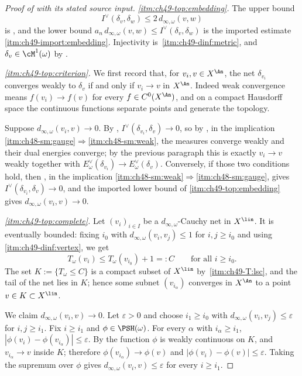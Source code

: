 \begin{proof}[Proof of  with its stated source input]
\emph{\cref{itm:ch49-top:embedding}.}  The upper bound
\[
 I^\vee(\delta_v,\delta_w)\le2\,d_{\infty,\omega}(v,w)
\]
is , and the lower bound
$a_n\,d_{\infty,\omega}(v,w)\le I^\vee(\delta_v,\delta_w)$
is the imported estimate
\,\cref{itm:ch49-import:embedding}.
Injectivity is
\,\cref{itm:ch49-dinf:metric}, and
$\delta_v\in\cM^1(\omega)$ by .

\emph{\cref{itm:ch49-top:criterion}.}  We first record that, for
$v_i,v\in X^{\An}$, the net $\delta_{v_i}$ converges weakly to
$\delta_v$ if and only if $v_i\to v$ in $X^{\An}$.  Indeed weak
convergence means $f(v_i)\to f(v)$ for every $f\in C^0(X^{\An})$, and
on a compact Hausdorff space the continuous functions separate points and
generate the topology.

Suppose $d_{\infty,\omega}(v_i,v)\to0$.  By
, $I^\vee(\delta_{v_i},\delta_v)\to0$, so
by , in the implication
\cref{itm:ch48-sm:gauge}$\Rightarrow$\cref{itm:ch48-sm:weak}, the measures converge weakly and their dual
energies converge; by the previous paragraph this is exactly
$v_i\to v$ weakly together with
$E^\vee_\omega(\delta_{v_i})\to E^\vee_\omega(\delta_v)$.  Conversely, if
those two conditions hold, then , in the
implication \cref{itm:ch48-sm:weak}$\Rightarrow$\cref{itm:ch48-sm:gauge}, gives
$I^\vee(\delta_{v_i},\delta_v)\to0$, and the imported lower bound of
\cref{itm:ch49-top:embedding} gives $d_{\infty,\omega}(v_i,v)\to0$.

\emph{\cref{itm:ch49-top:complete}.}  Let $(v_i)_{i\in I}$ be a
$d_{\infty,\omega}$-Cauchy net in $X^{\lin}$.  It is eventually bounded: fixing
$i_0$ with $d_{\infty,\omega}(v_i,v_j)\le1$ for $i,j\ge i_0$ and
using \,\cref{itm:ch49-dinf:vertex}, we get
\[
 T_\omega(v_i)\le T_\omega(v_{i_0})+1=:C
 \qquad\text{for all }i\ge i_0 .
\]
The set $K:=\{T_\omega\le C\}$ is a compact subset of $X^{\lin}$ by
\,\cref{itm:ch49-T:lsc}, and the tail of the
net lies in $K$; hence some subnet $(v_{i_\alpha})$ converges in
$X^{\An}$ to a point $v\in K\subset X^{\lin}$.

We claim $d_{\infty,\omega}(v_i,v)\to0$.  Let $\varepsilon>0$ and
choose $i_1\ge i_0$ with $d_{\infty,\omega}(v_i,v_j)\le\varepsilon$ for
$i,j\ge i_1$.  Fix $i\ge i_1$ and $\phi\in\PSH(\omega)$.  For every
$\alpha$ with $i_\alpha\ge i_1$,
$|\phi(v_i)-\phi(v_{i_\alpha})|\le\varepsilon$.  By
 the function $\phi$ is
weakly continuous on $K$, and $v_{i_\alpha}\to v$ inside $K$;
therefore $\phi(v_{i_\alpha})\to\phi(v)$ and
$|\phi(v_i)-\phi(v)|\le\varepsilon$.  Taking the supremum over $\phi$
gives $d_{\infty,\omega}(v_i,v)\le\varepsilon$ for every $i\ge i_1$.


\end{proof}
